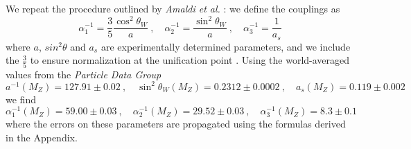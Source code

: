 \documentclass[12pt,a4paper,oneside]{article}
\begin{document}
We repeat the procedure outlined by \textit{Amaldi et al.} \cite{amaldi}: we define the couplings as
\[
\alpha_1^{-1} = \dfrac{3}{5} \dfrac{\cos^2 \theta_W}{a} \:, \quad
\alpha_2^{-1} = \dfrac{\sin^2 \theta_W}{a} \:, \quad
\alpha_3^{-1} = \dfrac{1}{a_s}
\]
where $a$, $sin^2 \theta$ and $a_s$ are experimentally determined parameters, and we include the $\frac{3}{5}$ to ensure normalization at the unification point \cite{5thirds}. Using the world-averaged values from the \textit{Particle Data Group} \cite{pdg}
\[
a^{-1} (M_Z) = 127.91 \pm 0.02 \:, \quad
\sin^2 \theta_W (M_Z) = 0.2312 \pm 0.0002  \:, \quad
a_s (M_Z) = 0.119 \pm 0.002
\]
we find
\begin{equation}
\alpha_1^{-1} (M_Z) = 59.00 \pm 0.03 \:, \quad
\alpha_2^{-1} (M_Z) =  29.52 \pm 0.03 \:, \quad
\alpha_3^{-1} (M_Z) =  8.3 \pm 0.1
\label{eqn:couplingvals}
\end{equation}
where the errors on these parameters are propagated using the formulas derived in the Appendix.
\end{document}
